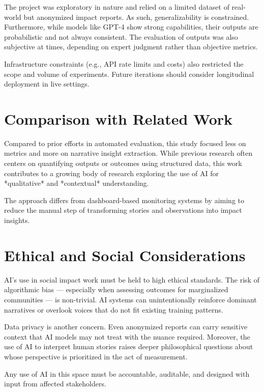 The project was exploratory in nature and relied on a limited dataset of real-world but anonymized impact reports. As such, generalizability is constrained. Furthermore, while models like GPT-4 show strong capabilities, their outputs are probabilistic and not always consistent. The evaluation of outputs was also subjective at times, depending on expert judgment rather than objective metrics.

Infrastructure constraints (e.g., API rate limits and costs) also restricted the scope and volume of experiments. Future iterations should consider longitudinal deployment in live settings.

\section{Comparison with Related Work}

Compared to prior efforts in automated evaluation, this study focused less on metrics and more on narrative insight extraction. While previous research often centers on quantifying outputs or outcomes using structured data, this work contributes to a growing body of research exploring the use of AI for *qualitative* and *contextual* understanding.

The approach differs from dashboard-based monitoring systems by aiming to reduce the manual step of transforming stories and observations into impact insights.

\section{Ethical and Social Considerations}

AI's use in social impact work must be held to high ethical standards. The risk of algorithmic bias — especially when assessing outcomes for marginalized communities — is non-trivial. AI systems can unintentionally reinforce dominant narratives or overlook voices that do not fit existing training patterns.

Data privacy is another concern. Even anonymized reports can carry sensitive context that AI models may not treat with the nuance required. Moreover, the use of AI to interpret human stories raises deeper philosophical questions about whose perspective is prioritized in the act of measurement.

Any use of AI in this space must be accountable, auditable, and designed with input from affected stakeholders.
